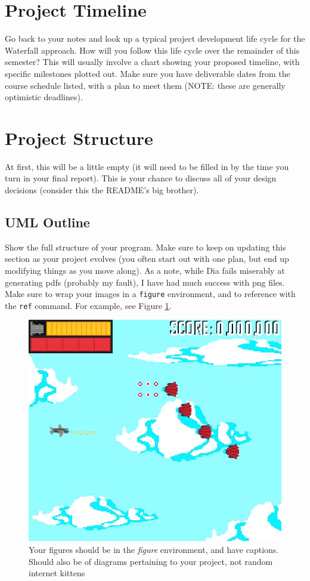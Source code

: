 \documentclass[10pt,conference,onecolumn,compsoc]{IEEEtran}
\begin{document}
\begin{enumerate}
\begin{enumerate}
\section{Project Timeline}
Go back to your notes and look up a typical project development life cycle for the Waterfall approach.  How will you follow this life cycle over the remainder of this semester?  This will usually involve a chart showing your proposed timeline, with specific milestones plotted out.  Make sure you have deliverable dates from the course schedule listed, with a plan to meet them (NOTE: these are generally optimistic deadlines).

\section{Project Structure}
At first, this will be a little empty (it will need to be filled in by the time you turn in your final report).  This is your chance to discuss all of your design decisions (consider this the README's big brother).

\subsection{UML Outline}
Show the full structure of your program.  Make sure to keep on updating this section as your project evolves (you often start out with one plan, but end up modifying things as you move along).  As a note, while Dia fails miserably at generating pdfs (probably my fault), I have had much success with png files.  Make sure to wrap your images in a \texttt{figure} environment, and to reference with the \texttt{ref} command.  For example, see Figure \ref{cat2}.

\begin{figure}[ht!]
\includegraphics[scale=1.5]{Spitfire_91MockUp.jpg}
\caption{Your figures should be in the \emph{figure} environment, and have captions.  Should also be of diagrams pertaining to your project, not random internet kittens}
\label{cat2}
\end{figure}



\end{enumerate}
\end{enumerate}
\end{document}
